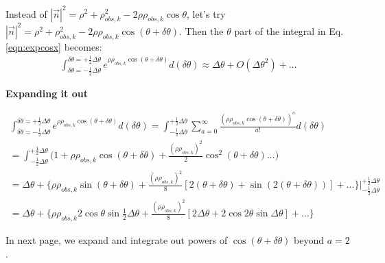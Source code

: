 \documentclass[12pt]{article}
\begin{document}
Instead of $|\vec n|^2 = \rho^2 + \rho^2_{obs,k} - 2\rho\rho_{obs,k}\cos\theta$, let's try \\$|\vec n|^2 = \rho^2 + \rho^2_{obs,k} - 2\rho\rho_{obs,k}\cos(\theta+\delta\theta)$. Then the $\theta$ part of the integral in Eq. \ref{eqn:expcosx} becomes:
        \begin{align}
        \int_{\delta\theta=-\frac{1}{2}\Delta\theta}^{\delta\theta=+\frac{1}{2}\Delta\theta} e^{\rho\rho_{obs,k}\cos(\theta+\delta\theta)}d(\delta\theta) \approx \Delta\theta + O(\Delta\theta^2)+...
        \end{align}
        
{\textbf{Expanding it out}}

	\begin{align}
        \int_{\delta\theta=-\frac{1}{2}\Delta\theta}^{\delta\theta=+\frac{1}{2}\Delta\theta} e^{\rho\rho_{obs,k}\cos(\theta+\delta\theta)}d(\delta\theta) = \int_{-\frac{1}{2}\Delta\theta}^{+\frac{1}{2}\Delta\theta} \sum_{a=0}^{\infty} \frac{(\rho\rho_{obs,k}\cos(\theta+\delta\theta))^a}{a!}d(\delta\theta) \\
        = \int_{-\frac{1}{2}\Delta\theta}^{+\frac{1}{2}\Delta\theta} \Big( 1 + \rho\rho_{obs,k}\cos(\theta+\delta\theta) + \frac{(\rho\rho_{obs,k})^2}{2}\cos^2(\theta+\delta\theta) ... \Big) \\
        = \Delta\theta + \Big\{\rho\rho_{obs,k}\sin(\theta+\delta\theta) + \frac{(\rho\rho_{obs,k})^2}{8}[2(\theta+\delta\theta) + \sin(2(\theta+\delta\theta))] + ... \Big\}\Big|^{+\frac{1}{2}\Delta\theta}_{-\frac{1}{2}\Delta\theta}\\
        = \Delta\theta + \Big\{\rho\rho_{obs,k}2\cos\theta\sin\frac{1}{2}\Delta\theta + \frac{(\rho\rho_{obs,k})^2}{8}[2\Delta\theta + 2\cos2\theta\sin\Delta\theta] + ... \Big\}
        \end{align}
        
In next page, we expand and integrate out powers of $\cos(\theta+\delta\theta)$ beyond $a=2$.
\end{document}
